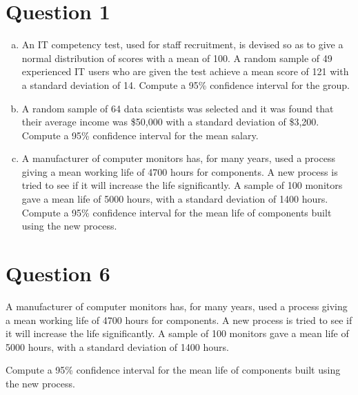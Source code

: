 
\smallskip




\section*{Question 1}
\begin{enumerate}[(a)]
    \item An IT competency test, used for staff recruitment, is devised so as to give a normal distribution of
scores with a mean of 100. A random sample of 49 experienced IT users who are given the test
achieve a mean score of 121 with a standard deviation of 14.
Compute a 95\% confidence interval for the group.
\item A random sample of 64 data scientists was selected and it was found that their average income was \${50,000} with a standard deviation of \${3,200}. 
Compute a 95\% confidence interval for the mean salary.
\item 
A manufacturer of computer monitors has, for many years, used a process giving a mean working life of 4700 hours for components. A new process is tried to see if it will increase the life significantly. A sample of 100 monitors gave a mean life of 5000 hours, with a standard deviation of 1400 hours.
Compute a 95\% confidence interval for the mean life of components built using the new process.

\end{enumerate}


	





\section*{Question 6}

A manufacturer of computer monitors has, for many years, used a process giving a mean working life of 4700 hours for components.
A new process is tried to see if it will increase the life significantly. A sample of 100 monitors gave a mean life of 5000 hours, with a standard deviation of 1400 hours.

Compute a 95\% confidence interval for the mean life of components built using the new process.


